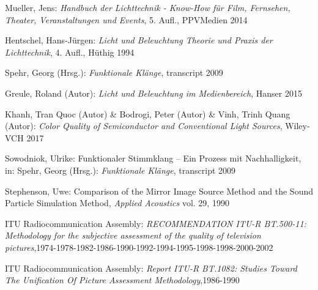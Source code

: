 \begin{thebibliography}{}
Mueller, Jens: 
\emph{Handbuch der Lichttechnik - Know-How für Film, Fernsehen, Theater, Veranstaltungen und Events}, 5. Aufl., PPVMedien 2014
 
Hentschel, Hans-Jürgen: 
\emph{Licht und Beleuchtung Theorie und Praxis der Lichttechnik}, 4. Aufl., Hüthig 1994

Spehr, Georg (Hrsg.): 
\emph{Funktionale Klänge}, transcript 2009

Greule, Roland (Autor):
\emph{Licht und Beleuchtung im Medienbereich}, Hanser 2015 

Khanh, Tran Quoc (Autor) \& Bodrogi, Peter (Autor) \& Vinh, Trinh Quang (Autor):
\emph{Color Quality of Semiconductor and Conventional Light Sources}, Wiley-VCH 2017


Sowodniok, Ulrike: 
\glqq Funktionaler Stimmklang -- Ein Prozess mit Nachhalligkeit\grqq, 
in: Spehr, Georg (Hrsg.): \emph{Funktionale Klänge}, transcript 2009




Stephenson, Uwe: 
\glqq Comparison of the Mirror Image Source Method and the Sound Particle Simulation Method\grqq, 
\emph{Applied Acoustics} vol. 29, 1990

ITU Radiocommunication Assembly:
\emph{RECOMMENDATION ITU-R BT.500-11: Methodology for the subjective assessment of the quality of television pictures},1974-1978-1982-1986-1990-1992-1994-1995-1998-1998-2000-2002

ITU Radiocommunication Assembly:
\emph{Report ITU-R BT.1082: Studies Toward The Unification Of Picture Assessment Methodology},1986-1990

\end{thebibliography}

\clearpage\thispagestyle{empty}
\eigen  %












